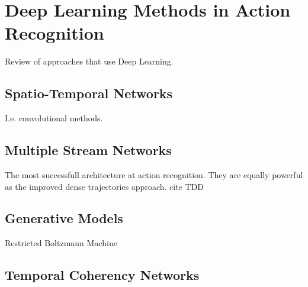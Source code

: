 \section{Deep Learning Methods in Action Recognition}
Review of approaches that use Deep Learning.

\subsection{Spatio-Temporal Networks}
I.e. convolutional methods.

\subsection{Multiple Stream Networks}
The most successfull architecture at action recognition. They are equally powerful as the improved dense trajectories approach. cite TDD

\subsection{Generative Models}
Restricted Boltzmann Machine

\subsection{Temporal Coherency Networks}
